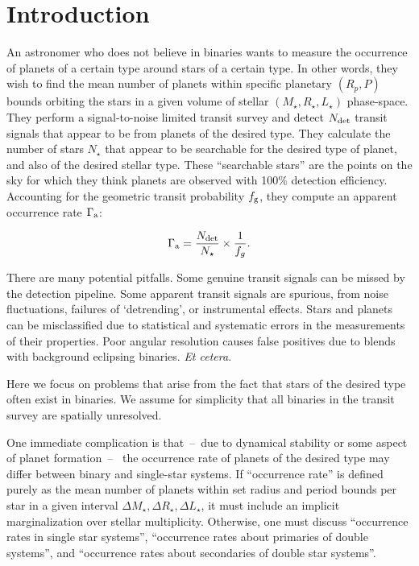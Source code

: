 \documentclass{emulateapj}
\begin{document}

\section{Introduction}

An astronomer who does not believe in binaries wants to measure the
occurrence of planets of a certain type around stars of a certain type.
In other words, they wish to find the mean number of planets within specific 
planetary $(R_p, P)$ bounds orbiting the stars in a given volume 
of stellar $(M_\star, R_\star, L_\star)$ phase-space.
They perform a signal-to-noise limited transit survey and detect $N_{\rm det}$ 
transit signals that appear to be from planets of the desired type.  They 
calculate the number of stars $N_\star$ that appear to be searchable for the 
desired type of planet, and also of the desired stellar type.  These 
``searchable stars'' are the points on the sky for which they think planets 
are observed with 100\% detection efficiency. Accounting for the geometric 
transit probability $f_{\rm g}$, they compute an apparent occurrence rate 
$\Gamma_{\rm a}$:

\begin{equation}
\Gamma_{\rm a} = \frac{N_{\rm det}}{N_\star} \times \frac{1}{f_g}.
\end{equation}

There are many potential pitfalls.  Some genuine transit signals can be missed
by the detection pipeline.  Some apparent transit signals are spurious, from
noise fluctuations, failures of `detrending', or instrumental effects.  Stars
and planets can be misclassified due to statistical and systematic errors in
the measurements of their properties.  Poor angular resolution causes false
positives due to blends with background eclipsing binaries. {\it Et cetera}.

Here we focus on problems that arise from the fact that stars of the desired
type often exist in binaries. 
We assume for simplicity that all binaries in the transit survey are 
spatially unresolved.

One immediate complication is that~--~due to dynamical stability or some 
aspect of planet formation~--~ the occurrence rate of planets of the desired 
type may differ between binary and single-star systems.
If ``occurrence rate'' is defined purely as the mean number of planets within 
set radius and period bounds per star in a given interval $\Delta M_\star, 
\Delta R_\star, \Delta L_\star$, it must include an implicit marginalization 
over stellar multiplicity.
Otherwise, one must discuss ``occurrence rates in single star systems'', 
``occurrence rates about primaries of double systems'', and
``occurrence rates about secondaries of double star systems''.
\end{document}
